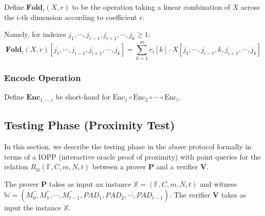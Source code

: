 Define $\textbf{Fold}_i(X, r)$ to be the operation taking a linear combination of $X$ across the $i$-th dimension according to coefficient $r$. 

Namely, for indexes $j_1, \cdots, j_{i-1}, j_{i+1}, \cdots , j_{k} \ge 1$:
$$
\textbf{Fold}_i(X, r)[j_1, \cdots, j_{i-1}, j_{i+1}, \cdots , j_{k}] = \sum_{k=1}^{m} r_{i}[k] \cdot X[j_1, \cdots, j_{i-1}, k, j_{i+1}, \cdots , j_{k}]
$$

\subsubsection{Encode Operation}

Define $\textbf{Enc}_{1,\cdots,i}$ be short-hand for $\text{Enc}_1 \circ \text{Enc}_2 \circ \cdots \circ \text{Enc}_{i}$.

\subsection{Testing Phase (Proximity Test)}

In this section, we describe the testing phase in the above protocol formally in terms of a IOPP (interactive oracle proof of proximity) with point queries for the relation $R_\otimes(\mathbb{F}, C, m, N, t)$ between a prover $\textbf{P}$ and a verifier $\textbf{V}$.

The prover $\textbf{P}$ takes as input an instance $\mathbb{X} = (\mathbb{F}, C, m, N, t)$ and witness $\mathbb{W} = (M_0^{\prime\prime}, M_1^{\prime\prime}, \cdots, M_{t-1}^{\prime\prime}, PAD_1, PAD_2, \cdots, PAD_{t-1})$. The verifier $\textbf{V}$ takes as input the instance $\mathbb{X}$.

